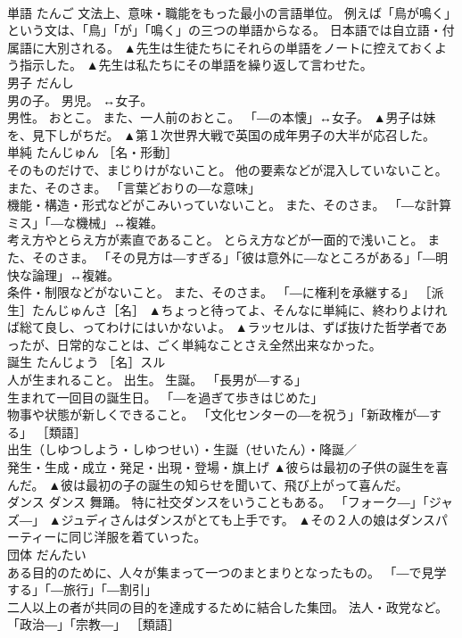 \documentclass[8pt]{extreport}
\begin{document}
\begin{CJK}{UTF8}{min}
\\	単語	たんご	文法上、意味・職能をもった最小の言語単位。 例えば「鳥が鳴く」という文は、「鳥」「が」「鳴く」の三つの単語からなる。 日本語では自立語・付属語に大別される。	▲先生は生徒たちにそれらの単語をノートに控えておくよう指示した。 ▲先生は私たちにその単語を繰り返して言わせた。
\\	男子	だんし	
\\	男の子。 男児。 ↔女子。 
\\	男性。 おとこ。 また、一人前のおとこ。 「―の本懐」↔女子。	▲男子は妹を、見下しがちだ。 ▲第１次世界大戦で英国の成年男子の大半が応召した。
\\	単純	たんじゅん	［名・形動］ 
\\	そのものだけで、まじりけがないこと。 他の要素などが混入していないこと。 また、そのさま。 「言葉どおりの―な意味」 
\\	機能・構造・形式などがこみいっていないこと。 また、そのさま。 「―な計算ミス」「―な機械」↔複雑。 
\\	考え方やとらえ方が素直であること。 とらえ方などが一面的で浅いこと。 また、そのさま。 「その見方は―すぎる」「彼は意外に―なところがある」「―明快な論理」↔複雑。 
\\	条件・制限などがないこと。 また、そのさま。 「―に権利を承継する」 ［派生］たんじゅんさ［名］	▲ちょっと待ってよ、そんなに単純に、終わりよければ総て良し、ってわけにはいかないよ。 ▲ラッセルは、ずば抜けた哲学者であったが、日常的なことは、ごく単純なことさえ全然出来なかった。
\\	誕生	たんじょう	［名］スル 
\\	人が生まれること。 出生。 生誕。 「長男が―する」 
\\	生まれて一回目の誕生日。 「―を過ぎて歩きはじめた」 
\\	物事や状態が新しくできること。 「文化センターの―を祝う」「新政権が―する」 ［類語］
\\	出生（しゆつしよう・しゆつせい）・生誕（せいたん）・降誕／
\\	発生・生成・成立・発足・出現・登場・旗上げ	▲彼らは最初の子供の誕生を喜んだ。 ▲彼は最初の子の誕生の知らせを聞いて、飛び上がって喜んだ。
\\	ダンス	ダンス	舞踊。 特に社交ダンスをいうこともある。 「フォーク―」「ジャズ―」	▲ジュディさんはダンスがとても上手です。 ▲その２人の娘はダンスパーティーに同じ洋服を着ていった。
\\	団体	だんたい	
\\	ある目的のために、人々が集まって一つのまとまりとなったもの。 「―で見学する」「―旅行」「―割引」 
\\	二人以上の者が共同の目的を達成するために結合した集団。 法人・政党など。 「政治―」「宗教―」 ［類語］

\end{CJK}
\end{document}
